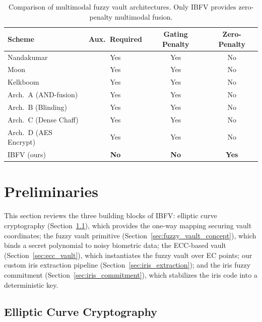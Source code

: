 \documentclass[3p,twocolumn]{elsarticle}
\newcommand{\IBFV}{\textsf{IBFV}}
\begin{document}
\begin{table}[t]
\centering
\caption{Comparison of multimodal fuzzy vault architectures. Only \IBFV{} provides zero-penalty multimodal fusion.}
\label{tab:related_gap}
\begin{tabular}{@{}l c c c@{}}
\toprule
\textbf{Scheme} & \textbf{Aux.\ Required} & \textbf{Gating Penalty} & \textbf{Zero-Penalty} \\
\midrule
Nandakumar~\cite{nandakumar2008multibiometric} & Yes & Yes & No \\
Moon~\cite{moon2010multibiometric} & Yes & Yes & No \\
Kelkboom~\cite{kelkboom2011multialgorithm} & Yes & Yes & No \\
Arch.\ A (AND-fusion) & Yes & Yes & No \\
Arch.\ B (Blinding) & Yes & Yes & No \\
Arch.\ C (Dense Chaff) & Yes & Yes & No \\
Arch.\ D (AES Encrypt) & Yes & Yes & No \\
\midrule
\IBFV{} (ours) & \textbf{No} & \textbf{No} & \textbf{Yes} \\
\bottomrule
\end{tabular}
\end{table}

\section{Preliminaries}
\label{sec:preliminaries}

This section reviews the three building blocks of \IBFV{}: elliptic curve cryptography (Section~\ref{sec:ecc_background}), which provides the one-way mapping securing vault coordinates; the fuzzy vault primitive (Section~\ref{sec:fuzzy_vault_concept}), which binds a secret polynomial to noisy biometric data; the ECC-based vault (Section~\ref{sec:ecc_vault}), which instantiates the fuzzy vault over EC points; our custom iris extraction pipeline (Section~\ref{sec:iris_extraction}); and the iris fuzzy commitment (Section~\ref{sec:iris_commitment}), which stabilizes the iris code into a deterministic key.

\subsection{Elliptic Curve Cryptography}
\label{sec:ecc_background}
\end{document}
